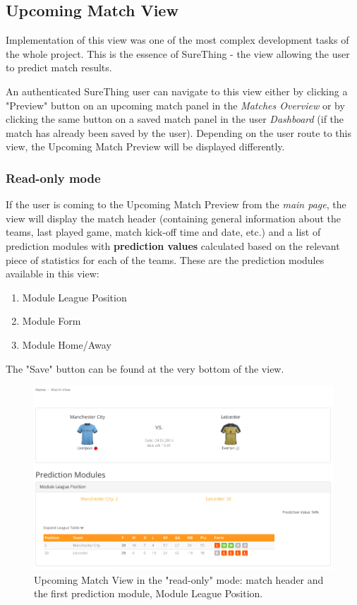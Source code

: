 \subsection{Upcoming Match View}
\label{subsec:implementupcomingmatchview}
Implementation of this view was one of the most complex development tasks of the whole project. This is the essence of SureThing - the view allowing the user to predict match results.

An authenticated SureThing user can navigate to this view either by clicking a "Preview" button on an upcoming match panel in the \emph{Matches Overview} or by clicking the same button on a saved match panel in the user \emph{Dashboard} (if the match has already been saved by the user). Depending on the user route to this view, the Upcoming Match Preview will be displayed differently.

\subsubsection*{Read-only mode}
If the user is coming to the Upcoming Match Preview from the \emph{main page}, the view will display the match header (containing general information about the teams, last played game, match kick-off time and date, etc.) and a list of prediction modules with \textbf{prediction values} calculated based on the relevant piece of statistics for each of the teams. These are the prediction modules available in this view:

\begin{enumerate}
	\item Module League Position
	\item Module Form
	\item Module Home/Away
\end{enumerate}

The "Save" button can be found at the very bottom of the view.

\begin{figure}[H]
	\begin{center}
		\includegraphics[width=.90\textwidth]{impl/images/upcomingMatchView}
		\caption{Upcoming Match View in the "read-only" mode: match header and the first prediction module, Module League Position.}
		\label{fig:using:upcominmatchview}
	\end{center}
\end{figure}

